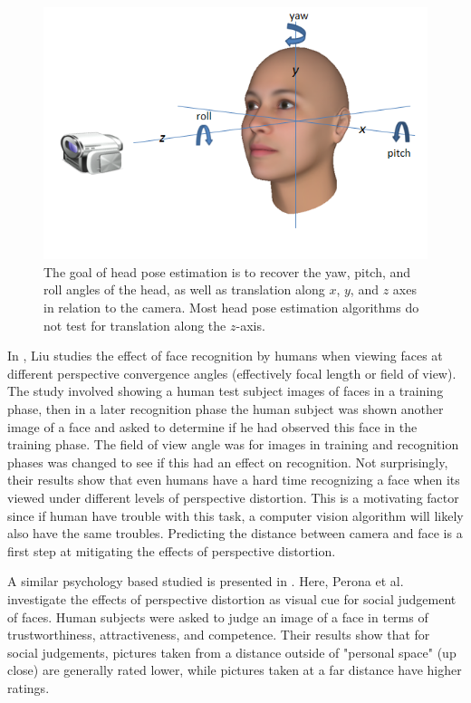 \documentclass[runningheads]{llncs}
\begin{document}
\begin{figure}[ht]
\centering
\includegraphics[width=.7\linewidth]{resources/figures/head_pose.png}
\caption{The goal of head pose estimation is to recover the yaw, pitch, and roll angles of the head, as well as translation along $x$, $y$, and $z$ axes in relation to the camera. 
Most head pose estimation algorithms do not test for translation along the $z$-axis.}
\label{fig:head_pose}
\end{figure}

In \cite{liu2003face,liu2006face}, Liu studies the effect of face recognition by humans when viewing faces at different perspective convergence angles (effectively focal length or field of view). 
The study involved showing a human test subject images of faces in a training phase, then in a later recognition phase the human subject was shown another image of a face and asked to determine if he had observed this face in the training phase. 
The field of view angle was for images in training and recognition phases was changed to see if this had an effect on recognition. 
Not surprisingly, their results show that even humans have a hard time recognizing a face when its viewed under different levels of perspective distortion.  
This is a motivating factor since if human have trouble with this task, a computer vision algorithm will likely also have the same troubles.  
Predicting the distance between camera and face is a first step at mitigating the effects of perspective distortion.

A similar psychology based studied is presented in \cite{perona2007new,bryan2012perspective}. 
Here, Perona et al. investigate the effects of perspective distortion as visual cue for social judgement of faces.  
Human subjects were asked to judge an image of a face in terms of trustworthiness, attractiveness, and competence.  
Their results show that for social judgements, pictures taken from a distance outside of "personal space" (up close) are generally rated lower, while pictures taken at a far distance have higher ratings.
\end{document}

